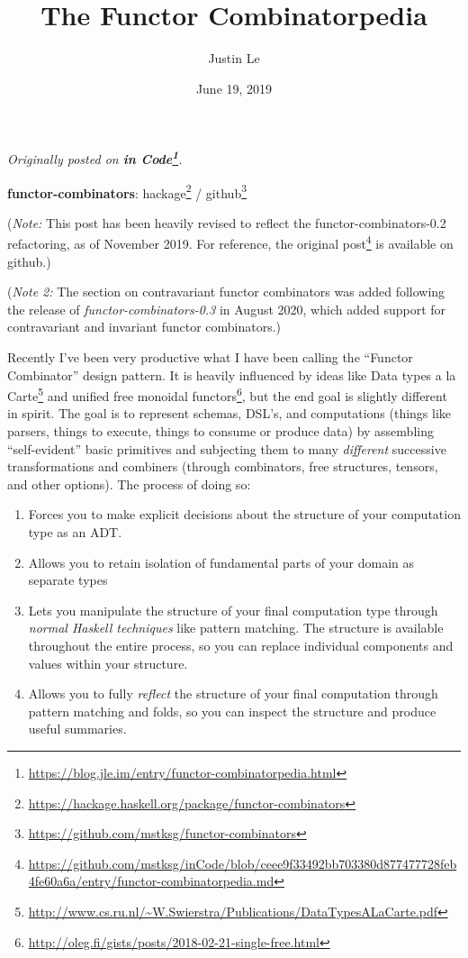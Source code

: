 \documentclass[]{article}
\title{The Functor Combinatorpedia}
\author{Justin Le}
\date{June 19, 2019}
\renewcommand{\href}[2]{#2\footnote{\url{#1}}}
\begin{document}
\maketitle

\emph{Originally posted on
\textbf{\href{https://blog.jle.im/entry/functor-combinatorpedia.html}{in
Code}}.}

\textbf{functor-combinators}:
\href{https://hackage.haskell.org/package/functor-combinators}{hackage} /
\href{https://github.com/mstksg/functor-combinators}{github}

(\emph{Note:} This post has been heavily revised to reflect the
functor-combinators-0.2 refactoring, as of November 2019. For reference,
\href{https://github.com/mstksg/inCode/blob/ceee9f33492bb703380d877477728feb4fe60a6a/entry/functor-combinatorpedia.md}{the
original post} is available on github.)

(\emph{Note 2:} The section on contravariant functor combinators was added
following the release of \emph{functor-combinators-0.3} in August 2020, which
added support for contravariant and invariant functor combinators.)

Recently I've been very productive what I have been calling the ``Functor
Combinator'' design pattern. It is heavily influenced by ideas like
\href{http://www.cs.ru.nl/~W.Swierstra/Publications/DataTypesALaCarte.pdf}{Data
types a la Carte} and
\href{http://oleg.fi/gists/posts/2018-02-21-single-free.html}{unified free
monoidal functors}, but the end goal is slightly different in spirit. The goal
is to represent schemas, DSL's, and computations (things like parsers, things to
execute, things to consume or produce data) by assembling ``self-evident'' basic
primitives and subjecting them to many \emph{different} successive
transformations and combiners (through combinators, free structures, tensors,
and other options). The process of doing so:

\begin{enumerate}
\def\labelenumi{\arabic{enumi}.}
\tightlist
\item
  Forces you to make explicit decisions about the structure of your computation
  type as an ADT.
\item
  Allows you to retain isolation of fundamental parts of your domain as separate
  types
\item
  Lets you manipulate the structure of your final computation type through
  \emph{normal Haskell techniques} like pattern matching. The structure is
  available throughout the entire process, so you can replace individual
  components and values within your structure.
\item
  Allows you to fully \emph{reflect} the structure of your final computation
  through pattern matching and folds, so you can inspect the structure and
  produce useful summaries.
\end{enumerate}
\end{document}
